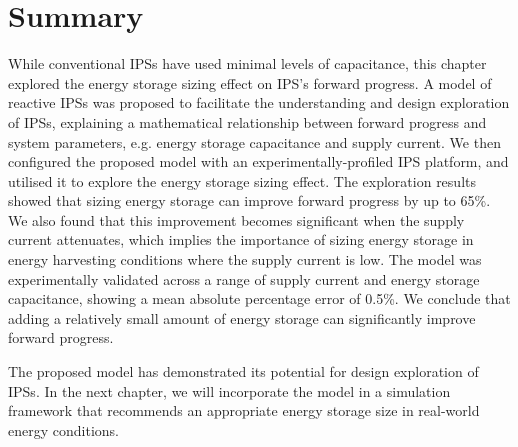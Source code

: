 \section{Summary} \label{sec:c3_summary}


While conventional IPSs have used minimal levels of capacitance, this chapter explored the energy storage sizing effect on IPS's forward progress.
A model of reactive IPSs was proposed to facilitate the understanding and design exploration of IPSs, explaining a mathematical relationship between forward progress and system parameters, e.g. energy storage capacitance and supply current.
We then configured the proposed model with an experimentally-profiled IPS platform, and utilised it to explore the energy storage sizing effect. 
The exploration results showed that sizing energy storage can improve forward progress by up to 65\%.
We also found that this improvement becomes significant when the supply current attenuates, which implies the importance of sizing energy storage in energy harvesting conditions where the supply current is low. 
The model was experimentally validated across a range of supply current and energy storage capacitance, showing a mean absolute percentage error of 0.5\%. 
We conclude that adding a relatively small amount of energy storage can significantly improve forward progress. 

The proposed model has demonstrated its potential for design exploration of IPSs. 
In the next chapter, we will incorporate the model in a simulation framework that recommends an appropriate energy storage size in real-world energy conditions. 

